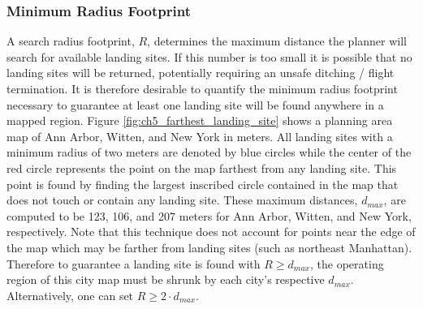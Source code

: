 \subsubsection{Minimum Radius Footprint}\label{sec:ch5_footprints}

A search radius footprint, $R$, determines the maximum distance the planner will search for available landing sites.  If this number is too small it is possible that no landing sites will be returned, potentially requiring an unsafe ditching / flight termination. It is therefore desirable to quantify the minimum radius footprint necessary to guarantee at least one landing site will be found anywhere in a mapped region.  Figure \ref{fig:ch5_farthest_landing_site} shows a planning area map of Ann Arbor, Witten, and New York in meters. All landing sites with a minimum radius of two meters are denoted by blue circles while the center of the red circle represents the point on the map farthest  from any landing site. This point is found by finding the largest inscribed circle contained in the map that does not touch or contain any landing site. These maximum distances, $d_{max}$, are computed to be 123, 106, and 207 meters for Ann Arbor, Witten, and New York, respectively. Note that this technique does not account for points near the edge of the map which may be farther from landing sites (such as northeast Manhattan).  Therefore to guarantee a landing site is found with $R \ge d_{max}$, the operating region of this city map must be shrunk by each city's respective $d_{max}$. Alternatively, one can set $R \ge 2 \cdot d_{max}$.


